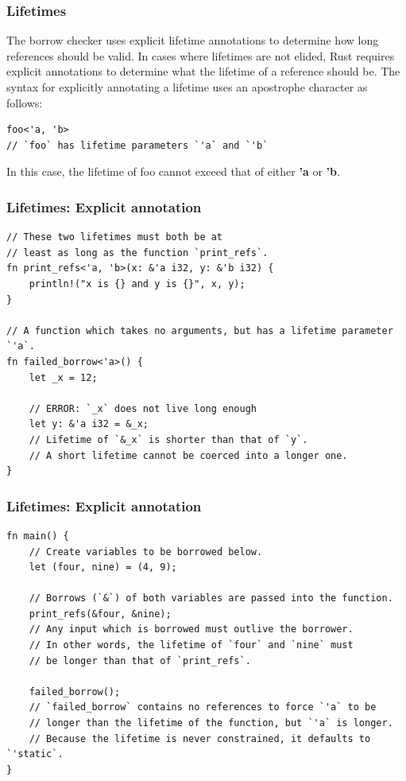 \documentclass[aspectratio=1610,t]{beamer}
\begin{document}

\begin{frame}[fragile]
\frametitle{Lifetimes}
The borrow checker uses explicit lifetime annotations to determine how long references should be valid. In cases where lifetimes are not elided, Rust requires explicit annotations to determine what the lifetime of a reference should be. The syntax for explicitly annotating a lifetime uses an apostrophe character as follows:
\begin{verbatim}
foo<'a, 'b>
// `foo` has lifetime parameters `'a` and `'b`
\end{verbatim}

In this case, the lifetime of foo cannot exceed that of either \textbf{'a} or \textbf{'b}.
\end{frame}


\begin{frame}[fragile]
\frametitle{Lifetimes: Explicit annotation}
\begin{verbatim}
// These two lifetimes must both be at
// least as long as the function `print_refs`.
fn print_refs<'a, 'b>(x: &'a i32, y: &'b i32) {
    println!("x is {} and y is {}", x, y);
}

// A function which takes no arguments, but has a lifetime parameter `'a`.
fn failed_borrow<'a>() {
    let _x = 12;

    // ERROR: `_x` does not live long enough
    let y: &'a i32 = &_x;
    // Lifetime of `&_x` is shorter than that of `y`.
    // A short lifetime cannot be coerced into a longer one.
}
\end{verbatim}
\end{frame}


\begin{frame}[fragile]
\frametitle{Lifetimes: Explicit annotation}
\begin{verbatim}
fn main() {
    // Create variables to be borrowed below.
    let (four, nine) = (4, 9);
    
    // Borrows (`&`) of both variables are passed into the function.
    print_refs(&four, &nine);
    // Any input which is borrowed must outlive the borrower. 
    // In other words, the lifetime of `four` and `nine` must 
    // be longer than that of `print_refs`.
    
    failed_borrow();
    // `failed_borrow` contains no references to force `'a` to be 
    // longer than the lifetime of the function, but `'a` is longer.
    // Because the lifetime is never constrained, it defaults to `'static`.
}
\end{verbatim}
\end{frame}
\end{document}
